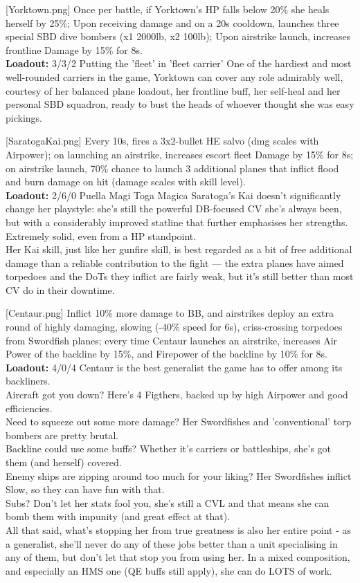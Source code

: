 [Yorktown.png]
{Once per battle, if Yorktown's HP falls below 20\% she heals herself by 25\%; Upon receiving damage and on a 20s cooldown, launches three special SBD dive bombers (x1 2000lb, x2 100lb); Upon airstrike launch, increases frontline Damage by 15\% for 8s.\\
\textbf{Loadout:} 3/3/2}
{Putting the 'fleet' in 'fleet carrier'}
{One of the hardiest and most well-rounded carriers in the game, Yorktown can cover any role admirably well, courtesy of her balanced plane loadout, her frontline buff, her self-heal and her personal SBD squadron, ready to bust the heads of whoever thought she was easy pickings.}

[SaratogaKai.png]
{Every 10s, fires a 3x2-bullet HE salvo (dmg scales with Airpower); on launching an airstrike, increases escort fleet Damage by 15\% for 8s; on airstrike launch, 70\% chance to launch 3 additional planes that inflict flood and burn damage on hit (damage scales with skill level).\\
\textbf{Loadout:} 2/6/0}
{Puella Magi Toga Magica}
{Saratoga's Kai doesn't significantly change her playstyle: she's still the powerful DB-focused CV she's always been, but with a considerably improved statline that further emphasises her strengths. Extremely solid, even from a HP standpoint.\\
Her Kai skill, just like her gunfire skill, is best regarded as a bit of free additional damage than a reliable contribution to the fight --- the extra planes have aimed torpedoes and the DoTs they inflict are fairly weak, but it's still better than most CV do in their downtime.}

[Centaur.png]
{Inflict 10\% more damage to BB, and airstrikes deploy an extra round of highly damaging, slowing (-40\% speed for 6s), criss-crossing torpedoes from Swordfish planes; every time Centaur launches an airstrike, increases Air Power of the backline by 15\%, and Firepower of the backline by 10\% for 8s.\\ 
\textbf{Loadout:} 4/0/4}
{}
{Centaur is the best generalist the game has to offer among its backliners.\\
Aircraft got you down? Here's 4 Figthers, backed up by high Airpower and good efficiencies. \\
Need to squeeze out some more damage? Her Swordfishes and 'conventional' torp bombers are pretty brutal.\\ 
Backline could use some buffs? Whether it's carriers or battleships, she's got them (and herself) covered. \\
Enemy ships are zipping around too much for your liking? Her Swordfishes inflict Slow, so they can have fun with that.\\
Subs? Don't let her stats fool you, she's still a CVL and that means she can bomb them with impunity (and great effect at that).\\
All that said, what's stopping her from true greatness is also her entire point - as a generalist, she'll never do any of these jobs better than a unit specialising in any of them, but don't let that stop you from using her. In a mixed composition, and especially an HMS one (QE buffs still apply), she can do LOTS of work.}


